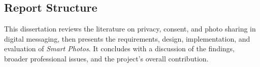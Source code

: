 \documentclass[11pt]{informatics-report}
\begin{document}
\subsection{Report Structure}

This dissertation reviews the literature on privacy, consent, and photo sharing in digital messaging, then presents the requirements, design, implementation, and evaluation of \textit{Smart Photos}. It concludes with a discussion of the findings, broader professional issues, and the project’s overall contribution.








 







%
% 
% 
% 
% 
% 
\end{document}
